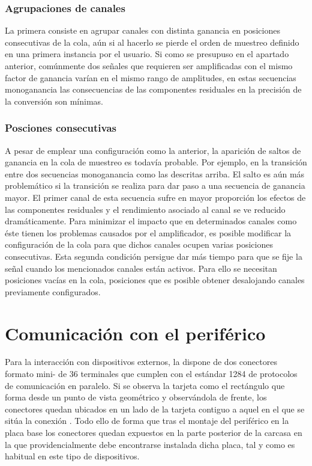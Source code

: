 \subsubsection{Agrupaciones de canales}

La primera consiste en agrupar canales con distinta ganancia en posiciones
consecutivas de la cola, aún si al hacerlo se pierde el orden de muestreo
definido en una primera instancia por el usuario. Si como se presupuso en
el apartado anterior, comúnmente dos señales que requieren ser amplificadas
con el mismo factor de ganancia varían en el mismo rango de amplitudes, en
estas secuencias monoganancia las consecuencias de las componentes
residuales en la precisión de la conversión son mínimas.


\subsubsection{Posciones consecutivas}

A pesar de emplear una configuración como la anterior, la aparición de
saltos de ganancia en la cola de muestreo es todavía probable. Por ejemplo,
en la transición entre dos secuencias monoganancia como las descritas
arriba. El salto es aún más problemático si la transición se realiza para
dar paso a una secuencia de ganancia mayor. El primer canal de esta
secuencia sufre en mayor proporción los efectos de las componentes
residuales y el rendimiento asociado al canal se ve reducido
dramáticamente. Para minimizar el impacto que en determinados canales como
éste tienen los problemas causados por el amplificador, es posible
modificar la configuración de la cola para que dichos canales ocupen varias
posiciones consecutivas. Esta segunda condición persigue dar más tiempo
para que se fije la señal cuando los mencionados canales están activos.
Para ello se necesitan posiciones vacías en la cola, posiciones que es
posible obtener desalojando canales previamente configurados.


\section{Comunicación con el periférico}

Para la interacción con dispositivos externos, la \kpci{} dispone de dos
conectores formato mini- de 36 terminales que cumplen con el
estándar  1284 de protocolos de comunicación en paralelo. Si se
observa la tarjeta como el rectángulo que forma desde un punto de vista
geométrico y observándola de frente, los conectores quedan ubicados en un
lado de la tarjeta contiguo a aquel en el que se sitúa la conexión
. Todo ello de forma que tras el montaje del periférico en la
placa base los conectores quedan expuestos en la parte posterior de la
carcasa en la que providencialmente debe encontrarse instalada dicha placa,
tal y como es habitual en este tipo de dispositivos.

